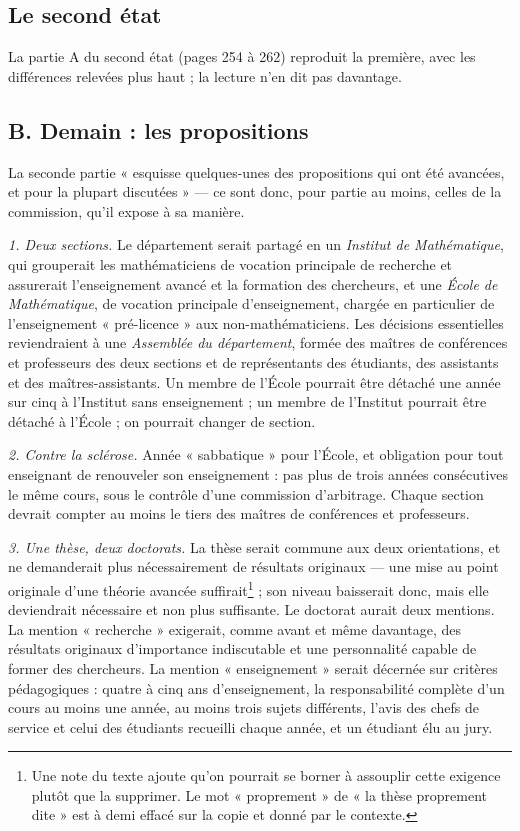 \documentclass[11pt,a4paper]{article}
\begin{document}
\subsection*{Le second état}

La partie A du second état (pages 254 à 262) reproduit la première, avec les
différences relevées plus haut ; la lecture n'en dit pas davantage.

\subsection*{B. Demain : les propositions}

La seconde partie « esquisse quelques-unes des propositions qui ont été
avancées, et pour la plupart discutées » — ce sont donc, pour partie au
moins, celles de la commission, qu'il expose à sa manière.

\emph{1. Deux sections.} Le département serait partagé en un \emph{Institut
de Mathématique}, qui grouperait les mathématiciens de vocation principale de
recherche et assurerait l'enseignement avancé et la formation des chercheurs,
et une \emph{École de Mathématique}, de vocation principale d'enseignement,
chargée en particulier de l'enseignement « pré-licence » aux non-mathématiciens.
Les décisions essentielles reviendraient à une \emph{Assemblée du département},
formée des maîtres de conférences et professeurs des deux sections et de
représentants des étudiants, des assistants et des maîtres-assistants. Un
membre de l'École pourrait être détaché une année sur cinq à l'Institut sans
enseignement ; un membre de l'Institut pourrait être détaché à l'École ; on
pourrait changer de section.

\emph{2. Contre la sclérose.} Année « sabbatique » pour l'École, et
obligation pour tout enseignant de renouveler son enseignement : pas plus de
trois années consécutives le même cours, sous le contrôle d'une commission
d'arbitrage. Chaque section devrait compter au moins le tiers des maîtres de
conférences et professeurs.

\emph{3. Une thèse, deux doctorats.} La thèse serait commune aux deux
orientations, et ne demanderait plus nécessairement de résultats originaux —
une mise au point originale d'une théorie avancée suffirait\footnote{Une
note du texte ajoute qu'on pourrait se borner à assouplir cette exigence
plutôt que la supprimer. Le mot « proprement » de « la thèse proprement
dite » est à demi effacé sur la copie et donné par le contexte.} ; son niveau
baisserait donc, mais elle deviendrait nécessaire et non plus suffisante.
Le doctorat aurait deux mentions. La mention « recherche » exigerait, comme
avant et même davantage, des résultats originaux d'importance indiscutable et
une personnalité capable de former des chercheurs. La mention
« enseignement » serait décernée sur critères pédagogiques : quatre à cinq ans
d'enseignement, la responsabilité complète d'un cours au moins une année, au
moins trois sujets différents, l'avis des chefs de service et celui des
étudiants recueilli chaque année, et un étudiant élu au jury.
\end{document}
